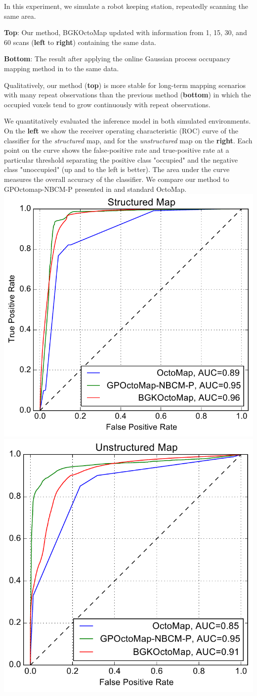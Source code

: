 \documentclass[portrait,final,archD,fontscale=0.477]{baposter}
\begin{document}
\begin{poster}
{\begin{multicols}{2}
\columnbreak

In this experiment, we simulate a robot keeping station, repeatedly scanning the same area. 

\textbf{Top}: Our method, BGKOctoMap updated with information from 1, 15, 30, and 60 scans (\textbf{left} to \textbf{right}) containing the same data.

\textbf{Bottom}: The result after applying the online Gaussian process occupancy mapping method in \cite{jwang} to the same data.

Qualitatively, our method (\textbf{top}) is more stable for long-term mapping scenarios with many repeat observations than the previous method (\textbf{bottom}) in which the occupied voxels tend to grow continuously with repeat observations.

\end{multicols}

\setlength{\columnsep}{0.1em}
\vspace{0.1em}
\begin{multicols}{2}

We quantitatively evaluated the inference model in both simulated environments. On the \textbf{left} we show the receiver operating characteristic (ROC) curve of the classifier for the \textit{structured} map, and for the \textit{unstructured} map on the \textbf{right}. Each point on the curve shows the false-positive rate and true-positive rate at a particular threshold separating the positive class "occupied" and the negative class "unoccupied" (up and to the left is better). The area under the curve measures the overall accuracy of the classifier. We compare our method to GPOctomap-NBCM-P presented in \cite{jwang} and standard OctoMap.
\\


{
\includegraphics[width=0.468\linewidth]{img/sim_structured_roc}
\includegraphics[width=0.45\linewidth]{img/sim_unstructured_roc} 
}


\end{multicols}}
\end{poster}
\end{document}
